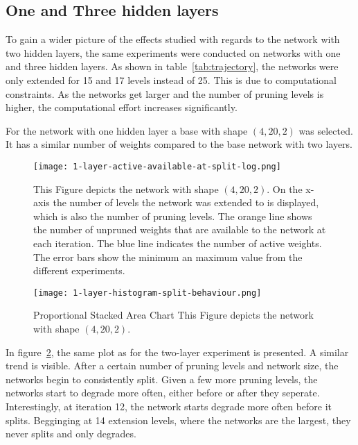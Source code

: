 \subsection{One and Three hidden layers}
To gain a wider picture of the effects studied with regards to the network with two hidden layers, the same experiments were conducted on networks with one and three hidden layers.
As shown in table~\ref{tab:trajectory}, the networks were only extended for 15 and 17 levels instead of 25. 
This is due to computational constraints. As the networks get larger and the number of pruning levels is higher, the computational effort increases significantly.

For the network with one hidden layer a base with shape $(4,20,2)$ was selected.
It has a similar number of weights compared to the base network with two layers.

\begin{figure}[ht]
    \centering
    \texttt{[image: 1-layer-active-available-at-split-log.png]}
    \caption{This Figure depicts the network with shape $(4,20,2)$.
    On the x-axis the number of levels the network was extended to is displayed, which is also the number of pruning levels.
    The orange line shows the number of unpruned weights that are available to the network at each iteration.
    The blue line indicates the number of active weights.
    The error bars show the minimum an maximum value from the different experiments.
    }\label{fig:1layer-active}
\end{figure}

\begin{figure}[ht]
    \centering
    \texttt{[image: 1-layer-histogram-split-behaviour.png]}
    \caption{
        Proportional Stacked Area Chart
        This Figure depicts the network with shape $(4,20,2)$.
    }\label{fig:1layer-histogram}
\end{figure}

In figure~\ref{fig:1layer-histogram}, the same plot as for the two-layer experiment is presented.
A similar trend is visible.
After a certain number of pruning levels and network size, the networks begin to consistently split.
Given a few more pruning levels, the networks start to degrade more often, either before or after they seperate.
Interestingly, at iteration 12, the network starts degrade more often before it splits.
Begginging at 14 extension levels, where the networks are the largest, they never splits and only degrades.


